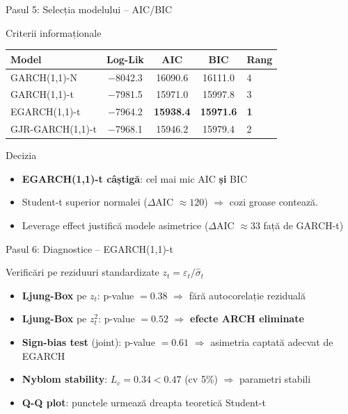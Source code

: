 \documentclass[9pt, aspectratio=169, t]{beamer}
\begin{document}
\begin{frame}{Pasul 5: Selecția modelului -- AIC/BIC}
    \small
        \begin{block}{Criterii informaționale}
            \begin{center}
            \begin{tabular}{lcccl}
                \toprule
                \textbf{Model} & \textbf{Log-Lik} & \textbf{AIC} & \textbf{BIC} & \textbf{Rang} \\
                \midrule
                GARCH(1,1)-N & $-$8042.3 & 16090.6 & 16111.0 & 4 \\
                GARCH(1,1)-t & $-$7981.5 & 15971.0 & 15997.8 & 3 \\
                EGARCH(1,1)-t & $-$7964.2 & \textbf{15938.4} & \textbf{15971.6} & \textbf{1} \\
                GJR-GARCH(1,1)-t & $-$7968.1 & 15946.2 & 15979.4 & 2 \\
                \bottomrule
            \end{tabular}
            \end{center}
        \end{block}
        \begin{exampleblock}{Decizia}
            \begin{itemize}
                \item \textbf{EGARCH(1,1)-t câștigă}: cel mai mic AIC \textbf{și} BIC
                \item Student-t superior normalei ($\Delta$AIC $\approx 120$) $\Rightarrow$ cozi groase contează.
                \item Leverage effect justifică modele asimetrice ($\Delta$AIC $\approx 33$ față de GARCH-t)
            \end{itemize}
        \end{exampleblock}
\end{frame}

\begin{frame}{Pasul 6: Diagnostice -- EGARCH(1,1)-t}
    \small
        \begin{block}{Verificări pe reziduuri standardizate $z_t = \varepsilon_t / \hat{\sigma}_t$}
            \begin{itemize}
                \item \textbf{Ljung-Box} pe $z_t$: p-value $= 0.38$ $\Rightarrow$ fără autocorelație reziduală
                \item \textbf{Ljung-Box} pe $z_t^2$: p-value $= 0.52$ $\Rightarrow$ \textbf{efecte ARCH eliminate}
                \item \textbf{Sign-bias test} (joint): p-value $= 0.61$ $\Rightarrow$ asimetria captată adecvat de EGARCH
                \item \textbf{Nyblom stability}: $L_c = 0.34 < 0.47$ (cv 5\%) $\Rightarrow$ parametri stabili
                \item \textbf{Q-Q plot}: punctele urmează dreapta teoretică Student-t
            \end{itemize}
        \end{block}
\end{frame}
\end{document}
